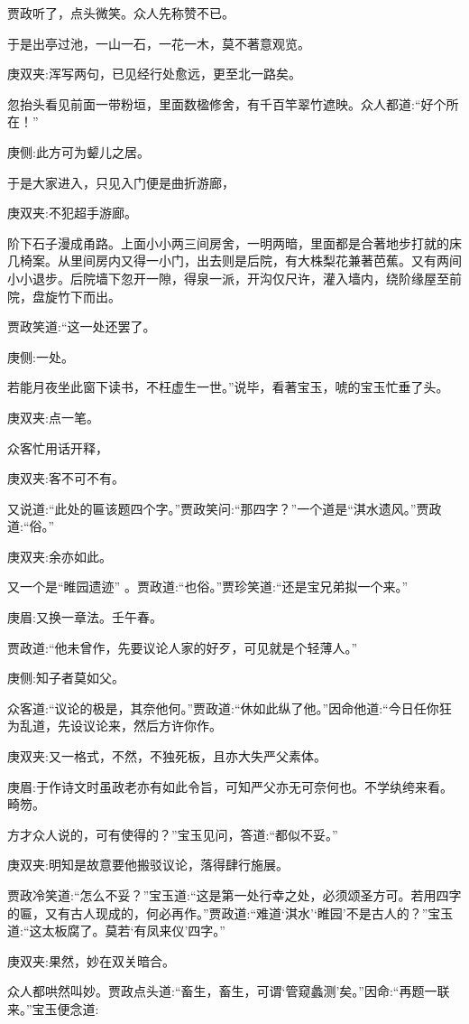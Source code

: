 \begin{parag}
    贾政听了，点头微笑。众人先称赞不已。
\end{parag}


\begin{parag}
    于是出亭过池，一山一石，一花一木，莫不著意观览。\begin{note}庚双夹:浑写两句，已见经行处愈远，更至北一路矣。\end{note}忽抬头看见前面一带粉垣，里面数楹修舍，有千百竿翠竹遮映。众人都道:“好个所在！”\begin{note}庚侧:此方可为颦儿之居。\end{note}于是大家进入，只见入门便是曲折游廊，\begin{note}庚双夹:不犯超手游廊。\end{note}阶下石子漫成甬路。上面小小两三间房舍，一明两暗，里面都是合著地步打就的床几椅案。从里间房内又得一小门，出去则是后院，有大株梨花兼著芭蕉。又有两间小小退步。后院墙下忽开一隙，得泉一派，开沟仅尺许，灌入墙内，绕阶缘屋至前院，盘旋竹下而出。
\end{parag}


\begin{parag}
    贾政笑道:“这一处还罢了。\begin{note}庚侧:一处。\end{note}若能月夜坐此窗下读书，不枉虚生一世。”说毕，看著宝玉，唬的宝玉忙垂了头。\begin{note}庚双夹:点一笔。\end{note}众客忙用话开释，\begin{note}庚双夹:客不可不有。\end{note}又说道:“此处的匾该题四个字。”贾政笑问:“那四字？”一个道是“淇水遗风。”贾政道:“俗。”\begin{note}庚双夹:余亦如此。\end{note}又一个是“睢园遗迹” 。贾政道:“也俗。”贾珍笑道:“还是宝兄弟拟一个来。”\begin{note}庚眉:又换一章法。壬午春。\end{note}贾政道:“他未曾作，先要议论人家的好歹，可见就是个轻薄人。”\begin{note}庚侧:知子者莫如父。\end{note}众客道:“议论的极是，其奈他何。”贾政道:“休如此纵了他。”因命他道:“今日任你狂为乱道，先设议论来，然后方许你作。\begin{note}庚双夹:又一格式，不然，不独死板，且亦大失严父素体。\end{note}\begin{note}庚眉:于作诗文时虽政老亦有如此令旨，可知严父亦无可奈何也。不学纨绔来看。畸笏。\end{note}方才众人说的，可有使得的？”宝玉见问，答道:“都似不妥。”\begin{note}庚双夹:明知是故意要他搬驳议论，落得肆行施展。\end{note}贾政冷笑道:“怎么不妥？”宝玉道:“这是第一处行幸之处，必须颂圣方可。若用四字的匾，又有古人现成的，何必再作。”贾政道:“难道‘淇水’‘睢园’不是古人的？”宝玉道:“这太板腐了。莫若‘有凤来仪’四字。”\begin{note}庚双夹:果然，妙在双关暗合。\end{note}众人都哄然叫妙。贾政点头道:“畜生，畜生，可谓‘管窥蠡测’矣。”因命:“再题一联来。”宝玉便念道:
\end{parag}


